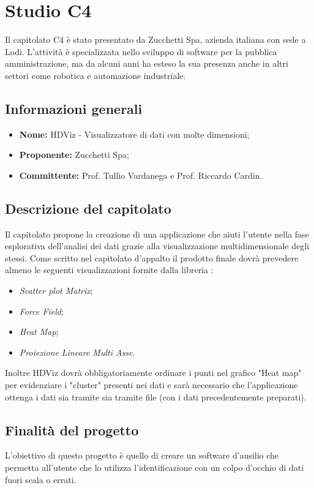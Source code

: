 \section{Studio C4} \label{_c4}
Il capitolato C4 è stato presentato da Zucchetti Spa, azienda italiana con sede a Lodi. L'attività è specializzata nello sviluppo di software per la pubblica amministrazione, ma da alcuni anni ha esteso la sua presenza anche in altri settori come robotica e automazione industriale.

\subsection{Informazioni generali}
\begin{itemize}
    \item \textbf{Nome:} HDViz - Visualizzatore di dati con molte dimensioni;
    \item \textbf{Proponente:} Zucchetti Spa;
    \item \textbf{Committente:} Prof. Tullio Vardanega e Prof. Riccardo Cardin.
\end{itemize}

\subsection{Descrizione del capitolato}
Il capitolato propone la creazione di una applicazione che aiuti l'utente nella fase esplorativa dell'analisi dei dati grazie alla visualizzazione multidimensionale degli stessi.
Come scritto nel capitolato d'appalto il prodotto finale dovrà prevedere almeno le seguenti visualizzazioni fornite dalla libreria \textit{}:
\begin{itemize}
    \item \textit{Scatter plot Matrix};
    \item \textit{Force Field};
    \item \textit{Heat Map};
    \item \textit{Proiezione Lineare Multi Asse}.
\end{itemize}
Inoltre HDViz dovrà obbligatoriamente ordinare i punti nel grafico "Heat map" per evidenziare i "cluster" presenti nei dati e sarà necessario che l'applicazione ottenga i dati sia tramite  sia tramite file  (con i dati precedentemente preparati).

\subsection{Finalità del progetto}
L'obiettivo di questo progetto è quello di creare un software d'ausilio che permetta all'utente che lo utilizza l'identificazione con un colpo d'occhio di dati fuori scala o errati.

